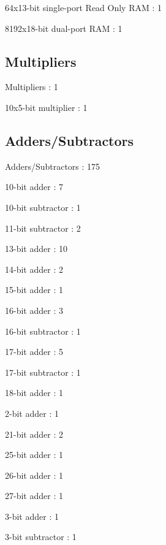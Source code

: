 \documentclass[letterpaper, 11 pt, conference]{article}
\begin{document}
 64x13-bit single-port Read Only RAM                   : 1

 8192x18-bit dual-port RAM                             : 1

\subsection{ Multipliers      }
Multipliers                                          : 1

 10x5-bit multiplier                                   : 1

\subsection{ Adders/Subtractors }
Adders/Subtractors                                   : 175

 10-bit adder                                          : 7

 10-bit subtractor                                     : 1

 11-bit subtractor                                     : 2

 13-bit adder                                          : 10

 14-bit adder                                          : 2

 15-bit adder                                          : 1

 16-bit adder                                          : 3

 16-bit subtractor                                     : 1

 17-bit adder                                          : 5

 17-bit subtractor                                     : 1

 18-bit adder                                          : 1

 2-bit adder                                           : 1

 21-bit adder                                          : 2

 25-bit adder                                          : 1

 26-bit adder                                          : 1

 27-bit adder                                          : 1

 3-bit adder                                           : 1

 3-bit subtractor                                      : 1
\end{document}
